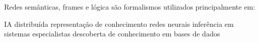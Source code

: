 \documentclass[12pt, addpoints]{exam}
\begin{document}
    \begin{questions}

    \newpage
    \question

Redes semânticas, frames e lógica são formalismos utilizados principalmente em: 
\begin{choices}
\choice IA distribuída
\choice representação de conhecimento
\choice redes neurais
\choice inferência em sistemas especialistas
\choice descoberta de conhecimento em bases de dados
\end{choices}



    \end{questions}
    
\end{document}
